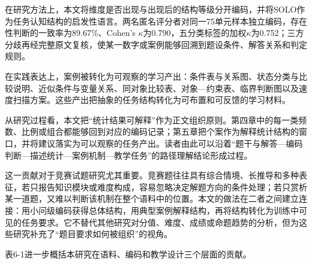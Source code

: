 \documentclass[
  12pt,
  a4paper,twoside,openany]{ctexbook}
\begin{document}
在研究方法上，本文将维度是否出现与出现后的结构等级分开编码，并将SOLO作为任务认知结构的启发性语言。两名匿名评分者对同一75单元样本独立编码，存在性判断的一致率为89.67\%、Cohen's
\(\kappa\)为0.790，五分类标签的加权\(\kappa\)为0.752；三方分歧再经完整原文复核，使某一数字或案例能够回溯到题设条件、解答关系和判定规则。

在实践表达上，案例被转化为可观察的学习产出：条件表与关系图、状态分类与比较说明、近似条件与变量关系、同对象比较表、对象---约束表、临界判断图以及速度扫描方案。这些产出把抽象的任务结构转化为可布置和可反馈的学习材料。

从研究过程看，本文把``统计结果可解释''作为正文组织原则。第四章中的每一类频数、比例或组合都能够回到对应的编码记录；第五章把个案作为解释统计结构的窗口，并将建议落实为可以观察的任务产出。读者由此可以沿着``题干与解答---编码判断---描述统计---案例机制---教学任务''的路径理解结论形成过程。

这一贡献对于竞赛试题研究尤其重要。竞赛题往往具有综合情境、长推导和多种表征，若只报告知识模块或难度构成，容易忽略决定解题方向的条件处理；若只赏析某一道题，又难以判断该机制在整个语料中的位置。本文的做法在二者之间建立连接：用小问级编码获得总体结构，用典型案例解释结构，再将结构转化为训练中可见的任务要求。它不替代其他研究对分值、难度、成绩或命题趋势的分析，但为这些研究补充了``题目要求如何被组织''的视角。

表6-1进一步概括本研究在语料、编码和教学设计三个层面的贡献。
\end{document}
